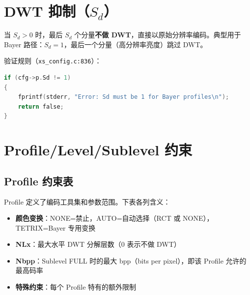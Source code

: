 \section{DWT 抑制（$S_d$）}

当 $S_d > 0$ 时，最后 $S_d$ 个分量\textbf{不做 DWT}，直接以原始分辨率编码。典型用于 Bayer 路径：$S_d = 1$，最后一个分量（高分辨率亮度）跳过 DWT。

验证规则（\texttt{xs\_config.c:836}）：
\begin{lstlisting}[language=C,numbers=none]
if (cfg->p.Sd != 1)
{
    fprintf(stderr, "Error: Sd must be 1 for Bayer profiles\n");
    return false;
}
\end{lstlisting}

\section{Profile/Level/Sublevel 约束}

\subsection{Profile 约束表}

Profile 定义了编码工具集和参数范围。下表各列含义：

\begin{itemize}
  \item \textbf{颜色变换}：NONE=禁止，AUTO=自动选择（RCT 或 NONE），TETRIX=Bayer 专用变换
  \item \textbf{NLx}：最大水平 DWT 分解层数（0 表示不做 DWT）
  \item \textbf{Nbpp}：Sublevel FULL 时的最大 bpp（bits per pixel），即该 Profile 允许的最高码率
  \item \textbf{特殊约束}：每个 Profile 特有的额外限制
\end{itemize}

